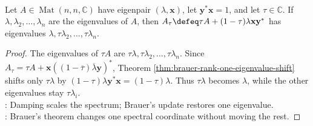 \begin{corollary} \label{cor:damped-rank-one-eigenvalue-reset} \\
Let $A\in\operatorname{Mat}(n,n,\mathbb{C})$ have eigenpair $(\lambda,\mathbf{x})$, let $\mathbf{y}^*\mathbf{x}=1$, and let $\tau\in\mathbb{C}$. If $\lambda,\lambda_2,\ldots,\lambda_n$ are the eigenvalues of $A$, then $A_{\tau}\defeq \tau A+(1-\tau)\lambda\mathbf{x}\mathbf{y}^*$ has eigenvalues $\lambda,\tau\lambda_2,\ldots,\tau\lambda_n$.
\begin{proof}
The eigenvalues of $\tau A$ are $\tau\lambda,\tau\lambda_2,\ldots,\tau\lambda_n$. Since $A_{\tau}=\tau A+\mathbf{x}((1-\overline{\tau})\overline{\lambda}\mathbf{y})^*$, Theorem \ref{thm:brauer-rank-one-eigenvalue-shift} shifts only $\tau\lambda$ by $(1-\tau)\lambda\mathbf{y}^*\mathbf{x}=(1-\tau)\lambda$. Thus $\tau\lambda$ becomes $\lambda$, while the other eigenvalues stay $\tau\lambda_i$.\\
: Damping scales the spectrum; Brauer's update restores one eigenvalue.\\
: Brauer's theorem changes one spectral coordinate without moving the rest.
\end{proof}
\end{corollary}
